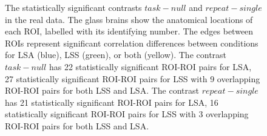 \documentclass[10pt,letterpaper]{article}
\newlength\savedwidth
\newcommand\thickhline{\noalign{\global\savedwidth\arrayrulewidth\global\arrayrulewidth 2pt}%
\hline
\noalign{\global\arrayrulewidth\savedwidth}}
\begin{document}
\begin{figure}[H]
  \centering


  \caption{
   The statistically significant contrasts $task - null$ and $repeat - single$
   in the real data.
   The glass brains show the anatomical locations of each ROI,
   labelled with its identifying number.
   The edges between ROIs represent significant correlation differences
   between conditions for LSA (blue), LSS (green), or both (yellow).
   The contrast $task - null$ has 22 statistically significant ROI-ROI
   pairs for LSA, 27 statistically significant ROI-ROI pairs
   for LSS with 9 overlapping ROI-ROI pairs for both LSS and LSA.
   The contrast $repeat - single$ has 21 statistically significant ROI-ROI
   pairs for LSA, 16 statistically significant ROI-ROI pairs
   for LSS with 3 overlapping ROI-ROI pairs for both LSS and LSA. 
  }
  \label{fig:significant-contrasts}
\end{figure}

\end{document}
